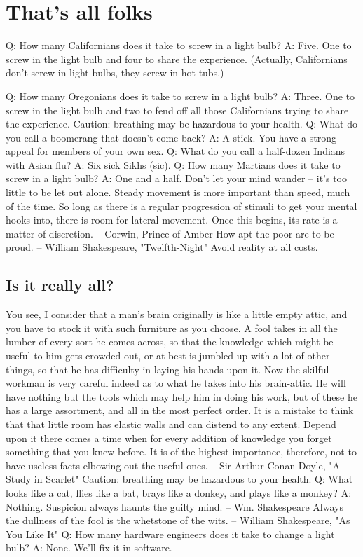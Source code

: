 \chapter{That's all folks}

Q:	How many Californians does it take to screw in a light bulb?
A:	Five.  One to screw in the light bulb and four to share the
		experience.  (Actually, Californians don't screw in
		light bulbs, they screw in hot tubs.)

Q:	How many Oregonians does it take to screw in a light bulb?
A:	Three.  One to screw in the light bulb and two to fend off all
		those Californians trying to share the experience.
Caution: breathing may be hazardous to your health.
Q:	What do you call a boomerang that doesn't come back?
A:	A stick.
You have a strong appeal for members of your own sex.
Q:	What do you call a half-dozen Indians with Asian flu?
A:	Six sick Sikhs (sic).
Q:	How many Martians does it take to screw in a light bulb?
A:	One and a half.
Don't let your mind wander -- it's too little to be let out alone.
Steady movement is more important than speed, much of the time.  So long
as there is a regular progression of stimuli to get your mental hooks
into, there is room for lateral movement.  Once this begins, its rate is
a matter of discretion.
		-- Corwin, Prince of Amber
How apt the poor are to be proud.
		-- William Shakespeare, "Twelfth-Night"
Avoid reality at all costs.

\section{Is it really all?}
You see, I consider that a man's brain originally is like a little empty
attic, and you have to stock it with such furniture as you choose.  A fool
takes in all the lumber of every sort he comes across, so that the knowledge
which might be useful to him gets crowded out, or at best is jumbled up with
a lot of other things, so that he has difficulty in laying his hands upon it.
Now the skilful workman is very careful indeed as to what he takes into his
brain-attic.  He will have nothing but the tools which may help him in doing
his work, but of these he has a large assortment, and all in the most perfect
order.  It is a mistake to think that that little room has elastic walls and
can distend to any extent.  Depend upon it there comes a time when for every
addition of knowledge you forget something that you knew before.  It is of
the highest importance, therefore, not to have useless facts elbowing out
the useful ones.
		-- Sir Arthur Conan Doyle, "A Study in Scarlet"
Caution: breathing may be hazardous to your health.
Q:	What looks like a cat, flies like a bat, brays like a donkey, and
	plays like a monkey?
A:	Nothing.
Suspicion always haunts the guilty mind.
		-- Wm. Shakespeare
Always the dullness of the fool is the whetstone of the wits.
		-- William Shakespeare, "As You Like It"
Q:	How many hardware engineers does it take to change a light bulb?
A:	None.  We'll fix it in software.


